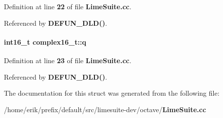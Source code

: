 Definition at line {\bf 22} of file {\bf Lime\+Suite.\+cc}.



Referenced by {\bf D\+E\+F\+U\+N\+\_\+\+D\+L\+D()}.

\paragraph[{q}]{\setlength{\rightskip}{0pt plus 5cm}int16\+\_\+t complex16\+\_\+t\+::q}\label{structcomplex16__t_a2f26982f3aaa0e15f42961a9b3a8930d}


Definition at line {\bf 23} of file {\bf Lime\+Suite.\+cc}.



Referenced by {\bf D\+E\+F\+U\+N\+\_\+\+D\+L\+D()}.



The documentation for this struct was generated from the following file\+:\begin{DoxyCompactItemize}
\item 
/home/erik/prefix/default/src/limesuite-\/dev/octave/{\bf Lime\+Suite.\+cc}\end{DoxyCompactItemize}
